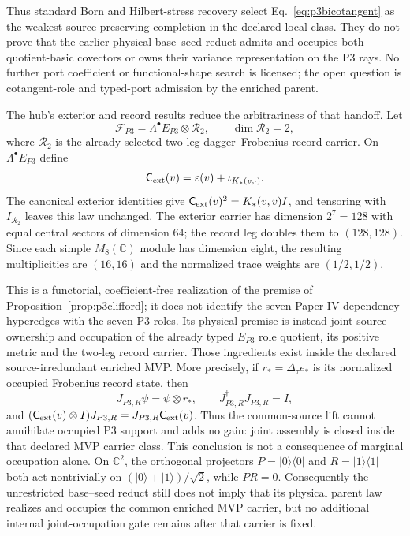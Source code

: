 Thus standard Born and Hilbert-stress recovery select
Eq.~\eqref{eq:p3bicotangent} as the weakest source-preserving completion in
the declared local class. They do not prove that the earlier physical
base--seed reduct admits and occupies both quotient-basic covectors or owns
their variance representation on the P3 rays. No further port coefficient or
functional-shape search is licensed; the open question is cotangent-role and
typed-port admission by the enriched parent.

The hub's exterior and record results reduce the arbitrariness of that handoff.
Let
\begin{equation}
\mathcal F_{P3}=\Lambda^\bullet E_{P3}\otimes\mathcal R_2,
\qquad \dim\mathcal R_2=2,
\label{eq:p3fockrecord}
\end{equation}
where $\mathcal R_2$ is the already selected two-leg dagger--Frobenius record
carrier.  On $\Lambda^\bullet E_{P3}$ define
\begin{equation}
\mathsf C_{\rm ext}(v)=\varepsilon(v)+\iota_{K_*(v,\cdot)}.
\label{eq:p3extclifford}
\end{equation}
The canonical exterior identities give
$\mathsf C_{\rm ext}(v)^2=K_*(v,v)I$, and tensoring with
$I_{\mathcal R_2}$ leaves this law unchanged.  The exterior carrier has
dimension $2^7=128$ with equal central sectors of dimension $64$; the record
leg doubles them to $(128,128)$.  Since each simple $M_8(\mathbb C)$ module has
dimension eight, the resulting multiplicities are $(16,16)$ and the normalized
trace weights are $(1/2,1/2)$.

This is a functorial, coefficient-free realization of the premise of
Proposition~\ref{prop:p3clifford}; it does not identify the seven Paper-IV
dependency hyperedges with the seven P3 roles.  Its physical premise is instead
joint source ownership and occupation of the already typed $E_{P3}$ role
quotient, its positive metric and the two-leg record carrier.  Those ingredients
exist inside the declared source-irredundant enriched MVP.  More precisely,
if $r_*=\Delta_\tau e_*$ is its normalized occupied Frobenius record state,
then
\begin{equation}
J_{P3,R}\psi=\psi\otimes r_*,\qquad
J_{P3,R}^\dagger J_{P3,R}=I,
\label{eq:p3recordlift}
\end{equation}
and
$(\mathsf C_{\rm ext}(v)\otimes I)J_{P3,R}
=J_{P3,R}\mathsf C_{\rm ext}(v)$.
Thus the common-source lift cannot annihilate occupied P3 support and adds no
gain: joint assembly is closed inside that declared MVP carrier class.  This
conclusion is not a consequence of marginal occupation alone.  On
$\mathbb C^2$, the orthogonal projectors
$P=\lvert0\rangle\!\langle0\rvert$ and
$R=\lvert1\rangle\!\langle1\rvert$ both act nontrivially on
$(\lvert0\rangle+\lvert1\rangle)/\sqrt2$, while $PR=0$.
Consequently the unrestricted base--seed reduct still does not imply that its
physical parent law realizes and occupies the common enriched MVP carrier, but no additional internal
joint-occupation gate remains after that carrier is fixed.

